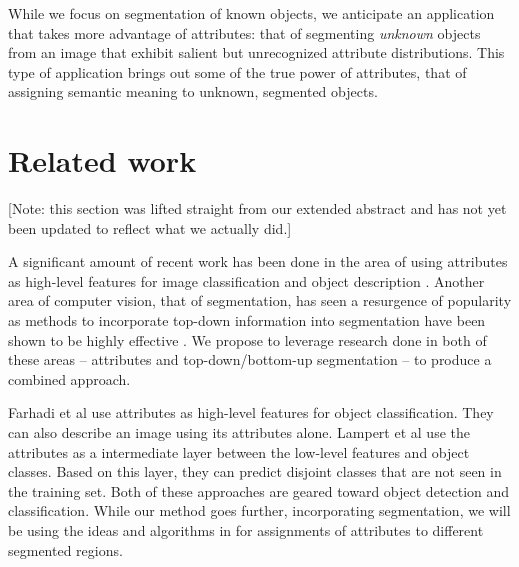 \documentclass[10pt,twocolumn,letterpaper]{article}
\begin{document}
While we focus on segmentation of known objects, we anticipate an application
that takes more advantage of attributes: that of segmenting \emph{unknown}
objects from an image that exhibit salient but unrecognized attribute
distributions.  This type of application brings out some of the true power of
attributes, that of assigning semantic meaning to unknown, segmented objects.


\section{Related work}
\label{sec:related_work}
[Note: this section was lifted straight from our extended abstract
and has not yet been updated to reflect what we actually did.]

A significant amount of recent work has been done in the area of using
attributes as high-level features for image classification and object
description \cite{farhadi09, lampert09, kumar09}.
Another area of computer vision, that of segmentation,
has seen a resurgence of popularity as methods to incorporate top-down
information into segmentation have been shown to be highly effective
\cite{borenstein04, pantofaru, gu09, russell06, malisiewicz, leibe04, hoiem05, shotton06}.
We propose to leverage research done in both of these areas -- attributes
and top-down/bottom-up segmentation -- to produce a combined approach.

Farhadi et al
\cite{farhadi09} use attributes as high-level features for object classification. They
can also describe an image using its attributes alone.
Lampert et al \cite{lampert09}
use the attributes as a intermediate layer between the low-level
features and object classes. Based on this layer, they can predict
disjoint classes that are not seen in the training set.  Both of these
approaches are geared toward object detection and classification.  While
our method goes further, incorporating segmentation, we will be using
the ideas and algorithms in \cite{farhadi09} for assignments of
attributes to different segmented regions.
\end{document}
